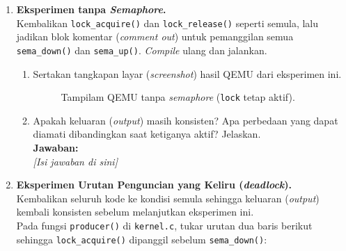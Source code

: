 \begin{enumerate}
	\item \textbf{Eksperimen tanpa \textit{Semaphore}.}\\
	      Kembalikan \texttt{lock\_acquire()} dan \texttt{lock\_release()} seperti semula, lalu jadikan blok komentar (\textit{comment out}) untuk pemanggilan semua \texttt{sema\_down()} dan \texttt{sema\_up()}. \textit{Compile} ulang dan jalankan.

	      \begin{enumerate}
		      \item Sertakan tangkapan layar (\textit{screenshot}) hasil QEMU dari eksperimen ini.


		            \begin{figure}[H]
			            \centering
			            \caption{Tampilam QEMU tanpa \textit{semaphore} (\texttt{lock} tetap aktif).}
		            \end{figure}

		      \item Apakah keluaran (\textit{output}) masih konsisten? Apa perbedaan yang dapat diamati dibandingkan saat ketiganya aktif? Jelaskan.\\[0.2cm]
		            \textbf{Jawaban:}\\
		            \textit{[Isi jawaban di sini]}
	      \end{enumerate}

	\item \textbf{Eksperimen Urutan Penguncian yang Keliru (\textit{deadlock}).}\\
	      Kembalikan seluruh kode ke kondisi semula sehingga keluaran (\textit{output}) kembali konsisten sebelum melanjutkan eksperimen ini.\\[0.2cm]
	      Pada fungsi \texttt{producer()} di \texttt{kernel.c}, tukar urutan dua baris berikut sehingga \texttt{lock\_acquire()} dipanggil sebelum \texttt{sema\_down()}:


\end{enumerate}
